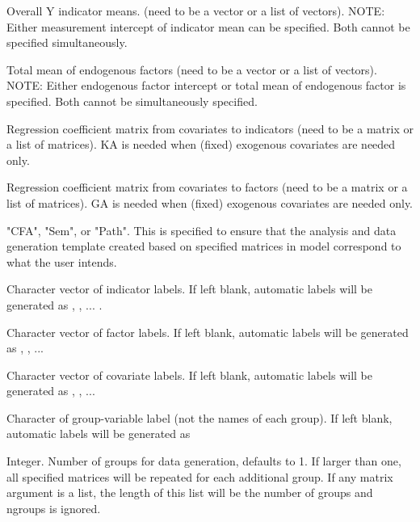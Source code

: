 \documentclass[a4paper]{book}
\begin{document}
\begin{Arguments}
\begin{ldescription}
\item[\code{MY}] 
Overall Y indicator means. (need to be a vector or a list of vectors). NOTE: Either measurement intercept of indicator mean can be specified. Both cannot be specified simultaneously.

\item[\code{ME}] 
Total mean of endogenous factors (need to be a vector or a list of vectors). NOTE: Either endogenous factor intercept or total mean of endogenous factor is specified. Both cannot be simultaneously specified.

\item[\code{KA}] 
Regression coefficient matrix from covariates to indicators (need to be a matrix or a list of matrices). KA is needed when (fixed) exogenous covariates are needed only.

\item[\code{GA}] 
Regression coefficient matrix from covariates to factors (need to be a matrix or a list of matrices). GA is needed when (fixed) exogenous covariates are needed only.

\item[\code{modelType}] 
"CFA", "Sem", or "Path". This is specified to ensure that the analysis and data generation template created based on specified matrices in model correspond to what the user intends.

\item[\code{indLab}] 
Character vector of indicator labels. If left blank, automatic labels will be generated as  , , ... .

\item[\code{facLab}]  
Character vector of factor labels. If left blank, automatic labels will be generated as , , ... 

\item[\code{covLab}]  
Character vector of covariate labels. If left blank, automatic labels will be generated as , , ... 

\item[\code{groupLab}] 
Character of group-variable label (not the names of each group). If left blank, automatic labels will be generated as 

\item[\code{ngroups}] 
Integer. Number of groups for data generation, defaults to 1. If larger than one, all specified matrices will be repeated for each additional group. If any matrix argument is a list, the length of this list will be the number of groups and ngroups is ignored.


\end{ldescription}
\end{Arguments}
\end{document}
